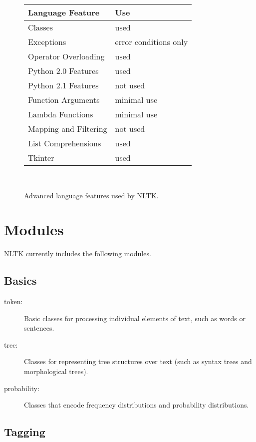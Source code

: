 \documentclass[11pt]{article}
\begin{document}
\begin{figure}
\begin{centering}
\begin{tabular}{|l|l|}
\hline
\textbf{Language Feature} & \textbf{Use} \\
\hline
Classes & used \\
Exceptions & error conditions only \\
Operator Overloading & used \\
Python 2.0 Features & used \\
Python 2.1 Features & not used \\
Function Arguments & minimal use \\
Lambda Functions & minimal use \\
Mapping and Filtering & not used \\
List Comprehensions & used \\
Tkinter & used \\
\hline
\end{tabular}\\
\end{centering}
\caption{Advanced language features used by NLTK.}
\label{fig:feature}
\end{figure}

\section{Modules}

NLTK currently includes the following modules.

\subsection*{Basics}

\begin{description}
\item[token:] Basic classes for processing individual
      elements of text, such as words or sentences. 
\item[tree:] Classes for representing tree structures
      over text (such as syntax trees and morphological trees).
\item[probability:] Classes that encode frequency
      distributions and probability distributions.
\end{description}

\subsection*{Tagging}
\end{document}
